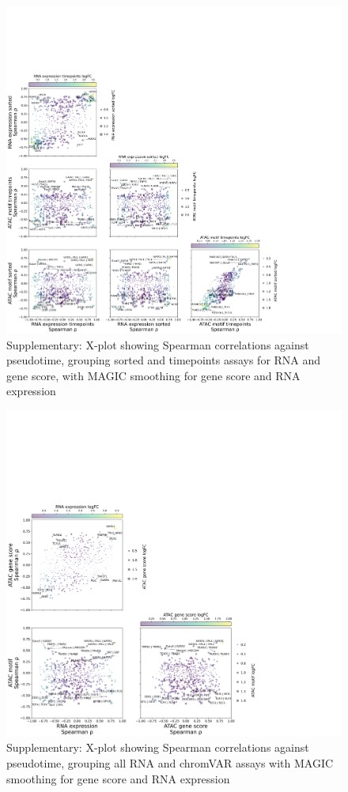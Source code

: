 \documentclass[a4paper]{article}
\begin{document}
\begin{figure}[!htb]
  \centering
  \includegraphics[width=\textwidth]{../figures/hematopoiesis/MKP_40_110_smooth_magic_semi_detailed_X_plot.png}
  \caption{Supplementary: X-plot showing Spearman correlations against pseudotime, grouping sorted and timepoints assays for RNA and gene score, with MAGIC smoothing for gene score and RNA expression}
\end{figure}

\begin{figure}[!htb]
  \centering
  \includegraphics[width=\textwidth]{../figures/hematopoiesis/MKP_40_110_smooth_magic_grouped_X_plot.png}
  \caption{Supplementary: X-plot showing Spearman correlations against pseudotime, grouping all RNA and chromVAR assays with MAGIC smoothing for gene score and RNA expression}
\end{figure}
\end{document}

